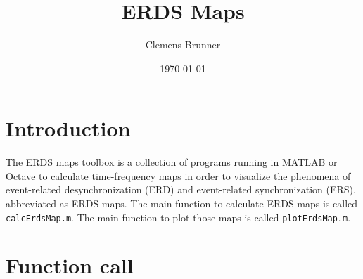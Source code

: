\documentclass[12pt,a4paper]{article}
\title{ERDS Maps}
\author{Clemens Brunner}
\date{\today}
\begin{document}
\maketitle

\section{Introduction}
The ERDS maps toolbox is a collection of programs running in MATLAB or Octave to calculate time-frequency maps in order to visualize the phenomena of event-related desynchronization (ERD) and event-related synchronization (ERS), abbreviated as ERDS maps. The main function to calculate ERDS maps is called \texttt{calcErdsMap.m}. The main function to plot those maps is called \texttt{plotErdsMap.m}.

\section{Function call}
\end{document}
